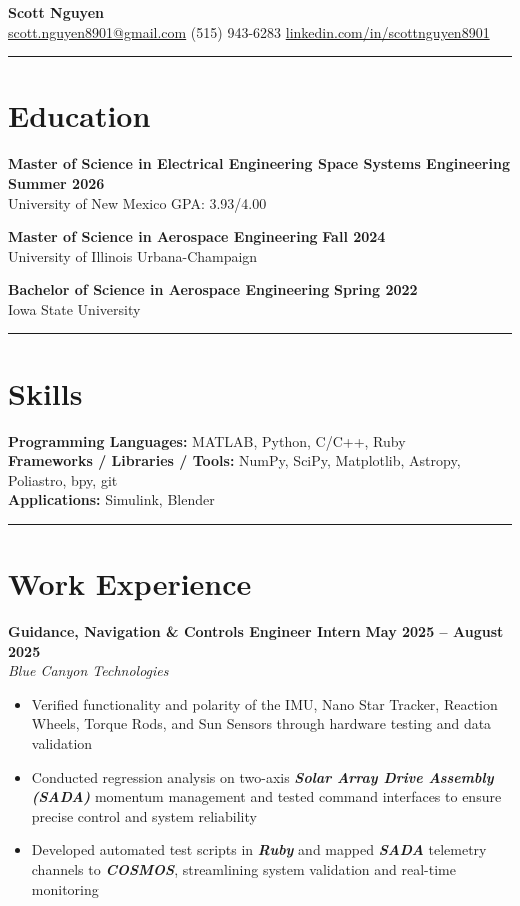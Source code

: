 \documentclass[10pt]{article}
\newcommand{\sectionline}{\noindent\rule{\linewidth}{0.4pt}}
\begin{document}
	
	\begin{center}
		{\color{mygreen}
			{\Huge \textbf{Scott Nguyen}} \\
			\href{mailto:scott.nguyen8901@gmail.com}{scott.nguyen8901@gmail.com} \quad \textbar \quad 
			(515) 943-6283 \quad \textbar \quad 
			\href{https://www.linkedin.com/in/scottnguyen8901/}{linkedin.com/in/scottnguyen8901}
		}
	\end{center}
	
	\sectionline
	
	\section*{Education}
	
	\textbf{Master of Science in Electrical Engineering \textbar Space Systems Engineering} \hfill \textbf{Summer 2026} \\
	University of New Mexico \hfill GPA: 3.93/4.00
	
	\textbf{Master of Science in Aerospace Engineering} \hfill \textbf{Fall 2024} \\
	University of Illinois Urbana-Champaign
	
	\textbf{Bachelor of Science in Aerospace Engineering} \hfill \textbf{Spring 2022} \\
	Iowa State University
	
	\sectionline
	
	\section*{Skills}
	\textbf{Programming Languages:} MATLAB, Python, C/C++, Ruby \\
	\textbf{Frameworks / Libraries / Tools:} NumPy, SciPy, Matplotlib, Astropy, Poliastro, bpy, git \\
	\textbf{Applications:} Simulink, Blender
	
	\sectionline
	
	\section*{Work Experience}
	
	\textbf{Guidance, Navigation \& Controls Engineer Intern} \hfill \textbf{May 2025 – August 2025} \\
	\emph{Blue Canyon Technologies}
	\begin{itemize}
	    \item Verified functionality and polarity of the IMU, Nano Star Tracker, Reaction Wheels, Torque Rods, and Sun Sensors through hardware testing and data validation
	    \item Conducted regression analysis on two-axis \textbf{\emph{Solar Array Drive Assembly (SADA)}} momentum management and tested command interfaces to ensure 			   precise control and system reliability
	    \item Developed automated test scripts in \textbf{\emph{Ruby}} and mapped \textbf{\emph{SADA}} telemetry channels to \textbf{\emph{COSMOS}}, streamlining system 		    validation and real-time monitoring
	\end{itemize}
\end{document}
